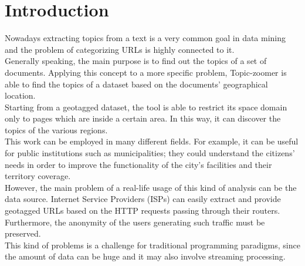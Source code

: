 \documentclass{sig-alternate-05-2015}
\begin{document}
\section{Introduction}
Nowadays extracting topics from a text is a very common goal in data mining and the problem of categorizing URLs is highly connected to it.\\
Generally speaking, the main purpose is to find out the topics of a set of documents. Applying this concept to a more specific problem, Topic-zoomer is able to find the topics of a dataset based on the documents' geographical location.\\
Starting from a geotagged dataset, the tool is able to restrict its space domain only to pages which are inside a certain area.
In this way, it can discover the topics of the various regions.\\
This work can be employed in many different fields. For example, it can be useful for public institutions such as municipalities; they could understand the citizens' needs in order to improve the functionality of the city's facilities and their territory coverage.\\
However, the main problem of a real-life usage of this kind of analysis can be the data source. Internet Service Providers (ISPs) can easily extract and provide geotagged URLs based on the HTTP requests passing through their routers. Furthermore, the anonymity of the users generating such traffic must be preserved.\\
This kind of problems is a challenge for traditional programming paradigms, since the amount of data can be huge and it may also involve streaming  processing.
\end{document}
